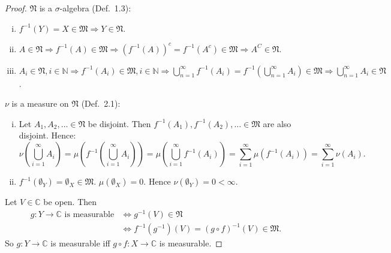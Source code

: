 \documentclass[10pt]{article}\usepackage[]{graphicx}\usepackage[]{color}
\newcommand{\N}{\mathbb{N}}
\newcommand{\C}{\mathbb{C}}
\begin{document}
\begin{proof}
$\mathfrak{N}$ is a $\sigma$-algebra (Def.~1.3):
\begin{enumerate}[(i)]
  \item $f^{-1}(Y) = X \in \mathfrak{M} \Rightarrow Y \in \mathfrak{N}$.

  \item $A \in \mathfrak{N} \Rightarrow f^{-1}(A) \in \mathfrak{M} \Rightarrow  (f^{-1}(A))^c = f^{-1}(A^c) \in \mathfrak{M} \Rightarrow A^C \in \mathfrak{N}$.

  \item $A_i \in \mathfrak{N}, i \in \N \Rightarrow f^{-1}(A_i) \in \mathfrak{M}, i \in \N \Rightarrow \bigcup_{n = 1}^{\infty} f^{-1}(A_i) = f^{-1}(\bigcup_{n = 1}^{\infty} A_i) \in \mathfrak{M} \Rightarrow \bigcup_{n = 1}^{\infty} A_i \in \mathfrak{N}$.
\end{enumerate}

$\nu$ is a measure on $\mathfrak{N}$ (Def.~2.1):
\begin{enumerate}[(i)]
  \item Let $A_1, A_2, \dots \in \mathfrak{N}$ be disjoint.
  Then $f^{-1}(A_1), f^{-1}(A_2), \dots \in \mathfrak{M}$ are
  also disjoint. Hence:
  \[
    \nu \left(\bigcup_{i = 1}^{\infty}A_i\right)
    = \mu \left(f^{-1}\left(\bigcup_{i = 1}^{\infty}A_i\right)\right)
    = \mu\left(\bigcup_{i = 1}^{\infty} f^{-1}(A_i)\right) 
    = \sum_{i=1}^{\infty}\mu(f^{-1}(A_i)) 
    = \sum_{i=1}^{\infty}\nu(A_i).
  \]
  
  \item $f^{-1}(\emptyset_Y) = \emptyset_X \in \mathfrak{M}.$ $\mu(\emptyset_X) = 0$. Hence $\nu(\emptyset_Y) = 0 < \infty$.
\end{enumerate}

Let $V \in \C$ be open. Then
\begin{align*}
  \textrm{$g : Y \to \C$ is measurable}
  &\Leftrightarrow g^{-1}(V) \in \mathfrak{N} \\
  &\Leftrightarrow f^{-1}(g^{-1})(V) = (g\circ f)^{-1}(V) \in \mathfrak{M}.
\end{align*}
So $g : Y \to \C$ is measurable iff $g \circ f : X \to \C$ is measurable.


\end{proof}
\end{document}

